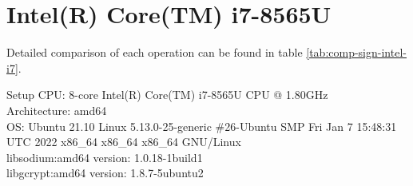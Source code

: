 \section{Intel(R) Core(TM) i7-8565U}
Detailed comparison of each operation can be found in table \ref{tab:comp-sign-intel-i7}.
\begin{bfhBox}{Setup}
	CPU: 8-core  Intel(R) Core(TM) i7-8565U CPU @ 1.80GHz \\
    Architecture: amd64 \\
    OS: Ubuntu 21.10 Linux 5.13.0-25-generic \#26-Ubuntu SMP Fri Jan 7 15:48:31 UTC 2022 x86\_64 x86\_64 x86\_64 GNU/Linux \\
    libsodium:amd64 version: 1.0.18-1build1 \\ 
    libgcrypt:amd64 version: 1.8.7-5ubuntu2 
\end{bfhBox}

